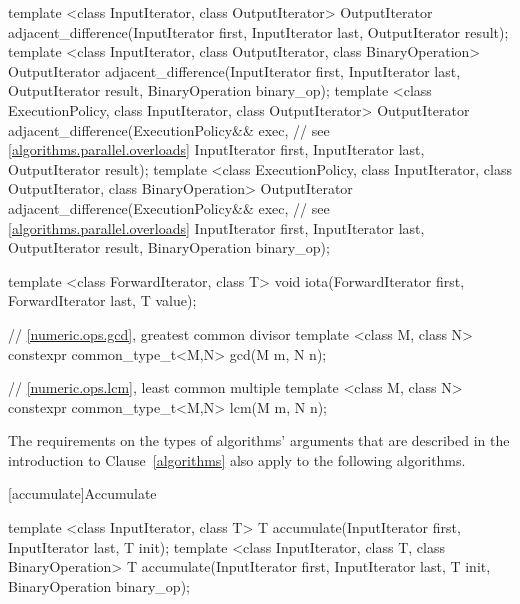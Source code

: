 \begin{codeblock}
{  template <class InputIterator, class OutputIterator>
    OutputIterator adjacent_difference(InputIterator first,
                                       InputIterator last,
                                       OutputIterator result);
  template <class InputIterator, class OutputIterator, class BinaryOperation>
    OutputIterator adjacent_difference(InputIterator first,
                                       InputIterator last,
                                       OutputIterator result,
                                       BinaryOperation binary_op);
  template <class ExecutionPolicy, class InputIterator, class OutputIterator>
    OutputIterator adjacent_difference(ExecutionPolicy&& exec, // see \ref{algorithms.parallel.overloads}
                                       InputIterator first,
                                       InputIterator last,
                                       OutputIterator result);
  template <class ExecutionPolicy, class InputIterator, class OutputIterator,
            class BinaryOperation>
    OutputIterator adjacent_difference(ExecutionPolicy&& exec, // see \ref{algorithms.parallel.overloads}
                                       InputIterator first,
                                       InputIterator last,
                                       OutputIterator result,
                                       BinaryOperation binary_op);

  template <class ForwardIterator, class T>
    void iota(ForwardIterator first, ForwardIterator last, T value);

  // \ref{numeric.ops.gcd}, greatest common divisor
  template <class M, class N>
    constexpr common_type_t<M,N> gcd(M m, N n);

  // \ref{numeric.ops.lcm}, least common multiple
  template <class M, class N>
    constexpr common_type_t<M,N> lcm(M m, N n);
}
\end{codeblock}

\pnum
The requirements on the types of algorithms' arguments that are
described in the introduction to Clause~\ref{algorithms} also
apply to the following algorithms.

[accumulate]{Accumulate}

%
\begin{itemdecl}
template <class InputIterator, class T>
  T accumulate(InputIterator first, InputIterator last, T init);
template <class InputIterator, class T, class BinaryOperation>
  T accumulate(InputIterator first, InputIterator last, T init,
               BinaryOperation binary_op);
\end{itemdecl}

